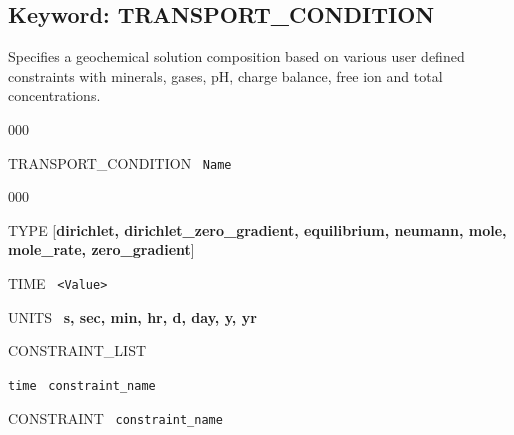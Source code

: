 \newpage
\protect\hypertarget{target_trans_cond}{}

\subsection{Keyword: TRANSPORT\_CONDITION}

\hfill\hyperlink{target_key}{\return}

 Specifies a geochemical solution composition based on various user defined constraints with minerals, gases, pH, charge balance, free ion and total concentrations.

\begin{deflist}{000}
\item[TRANSPORT\_CONDITION] \ {\tt Name}

\begin{deflist}{000}
\item[TYPE] [{\bf dirichlet, dirichlet\_zero\_gradient, equilibrium, neumann, mole, mole\_rate, \linebreak zero\_gradient}]
\item[TIME] \ {\tt <Value>}
\item[UNITS] \ {\bf s, sec, min, hr, d, day, y, yr}
\item[CONSTRAINT\_LIST]
\item {\tt time} \ {\tt constraint\_name}
\item[\keyend]
\item[CONSTRAINT] \ {\tt constraint\_name}
\end{deflist}
\item[\keyend]
\end{deflist}


